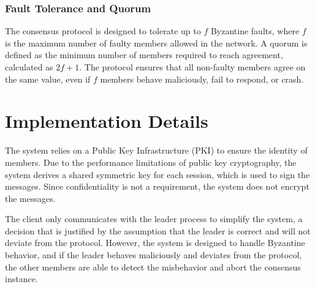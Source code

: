 \documentclass[runningheads]{llncs}
\begin{document}
\subsubsection{Fault Tolerance and Quorum}
The consensus protocol is designed to tolerate up to \( f \) Byzantine faults, where \( f \) is the maximum number of faulty members allowed in the network. A quorum is defined as the minimum number of members required to reach agreement, calculated as \( 2f+1 \). The protocol ensures that all non-faulty members agree on the same value, even if \( f \) members behave maliciously, fail to respond, or crash.

\section{Implementation Details}
The system relies on a Public Key Infrastructure (PKI) to ensure the identity of members. Due to the performance limitations of public key cryptography, the system derives a shared symmetric key for each session, which is used to sign the messages. Since confidentiality is not a requirement, the system does not encrypt the messages.

The client only communicates with the leader process to simplify the system, a decision that is justified by the assumption that the leader is correct and will not deviate from the protocol. However, the system is designed to handle Byzantine behavior, and if the leader behaves maliciously and deviates from the protocol, the other members are able to detect the misbehavior and abort the consensus instance.
\end{document}
